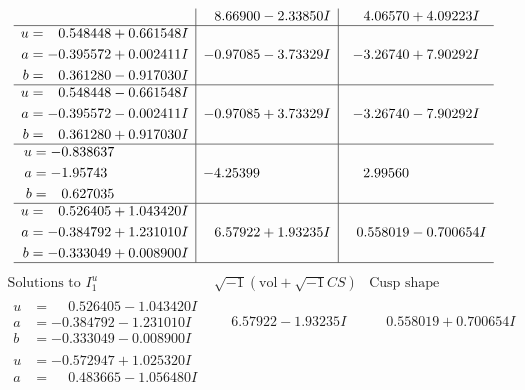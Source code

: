 \documentclass[1p]{elsarticle_modified}
\theoremstyle{definition}
\newcommand{\I}{\sqrt{-1}}
\begin{document}
$$\begin{array}{c|c|c}
 & \phantom{-}8.66900 - 2.33850 I & \phantom{-}4.06570 + 4.09223 I \\ \hline\begin{aligned}
u &= \phantom{-}0.548448 + 0.661548 I \\
a &= -0.395572 + 0.002411 I \\
b &= \phantom{-}0.361280 - 0.917030 I\end{aligned}
 & -0.97085 - 3.73329 I & -3.26740 + 7.90292 I \\ \hline\begin{aligned}
u &= \phantom{-}0.548448 - 0.661548 I \\
a &= -0.395572 - 0.002411 I \\
b &= \phantom{-}0.361280 + 0.917030 I\end{aligned}
 & -0.97085 + 3.73329 I & -3.26740 - 7.90292 I \\ \hline\begin{aligned}
u &= -0.838637\phantom{ +0.000000I} \\
a &= -1.95743\phantom{ +0.000000I} \\
b &= \phantom{-}0.627035\phantom{ +0.000000I}\end{aligned}
 & -4.25399\phantom{ +0.000000I} & \phantom{-}2.99560\phantom{ +0.000000I} \\ \hline\begin{aligned}
u &= \phantom{-}0.526405 + 1.043420 I \\
a &= -0.384792 + 1.231010 I \\
b &= -0.333049 + 0.008900 I\end{aligned}
 & \phantom{-}6.57922 + 1.93235 I & \phantom{-}0.558019 - 0.700654 I\\
 \hline 
 \end{array}$$\newpage$$\begin{array}{c|c|c}  
\text{Solutions to }I^u_{1}& \I (\text{vol} + \sqrt{-1}CS) & \text{Cusp shape}\\
 \hline 
\begin{aligned}
u &= \phantom{-}0.526405 - 1.043420 I \\
a &= -0.384792 - 1.231010 I \\
b &= -0.333049 - 0.008900 I\end{aligned}
 & \phantom{-}6.57922 - 1.93235 I & \phantom{-}0.558019 + 0.700654 I \\ \hline\begin{aligned}
u &= -0.572947 + 1.025320 I \\
a &= \phantom{-}0.483665 - 1.056480 I \\

\end{aligned}
\end{array}$$
\end{document}
